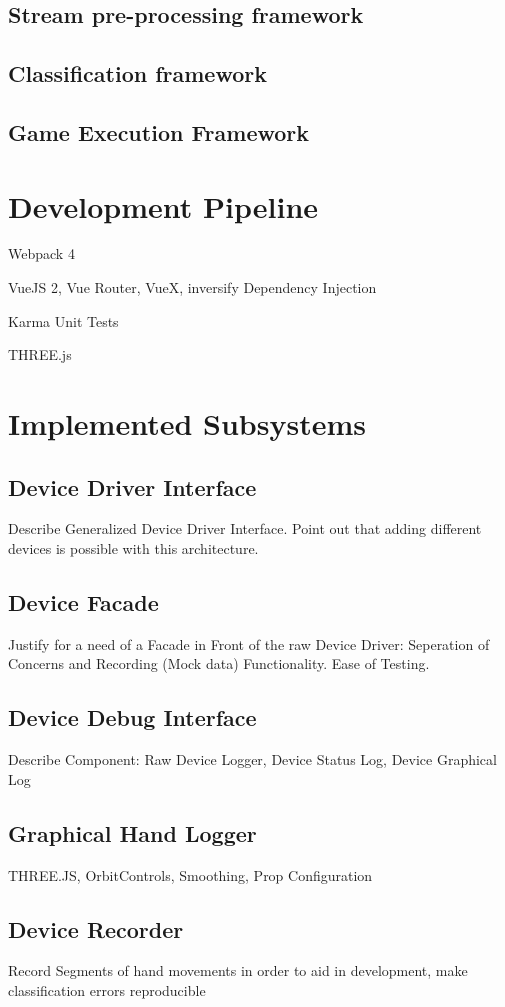 \subsection{Stream pre-processing framework}
\label{sec:impl:preprocessing}
\subsection{Classification framework}
\label{sec:impl:classify}
\subsection{Game Execution Framework}
\label{sec:impl:gameexec}




\section{Development Pipeline}
Webpack 4

VueJS 2, Vue Router, VueX, inversify Dependency Injection

Karma Unit Tests

THREE.js
\section{Implemented Subsystems}
\subsection{Device Driver Interface}
Describe Generalized Device Driver Interface. Point out that adding different devices is possible with this architecture.
\subsection{Device Facade}
Justify for a need of a Facade in Front of the raw Device Driver: Seperation of Concerns and Recording (Mock data) Functionality. Ease of Testing.
\subsection{Device Debug Interface}
Describe Component: Raw Device Logger, Device Status Log, Device Graphical Log
\subsection{Graphical Hand Logger}
THREE.JS, OrbitControls, Smoothing, Prop Configuration
\subsection{Device Recorder}
Record Segments of hand movements in order to aid in development, make classification errors reproducible
